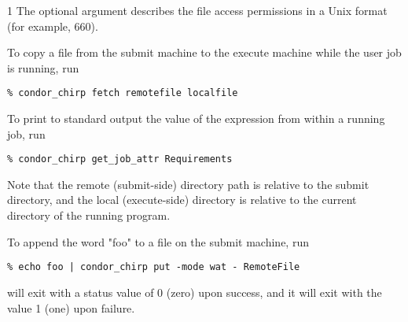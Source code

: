 \begin{ManPage}{\label{man-condor-chirp}}{1}
The optional  argument
describes the file access permissions in a Unix format
(for example, 660).

\begin{Options}
\end{Options}

\Examples

To copy a file from the submit machine to the execute machine while the 
user job is running, run

\footnotesize
\begin{verbatim}
% condor_chirp fetch remotefile localfile
\end{verbatim}
\normalsize

To print to standard output the value of the 
expression from within a running job, run

\footnotesize
\begin{verbatim}
% condor_chirp get_job_attr Requirements
\end{verbatim}
\normalsize

Note that the remote (submit-side) directory path is relative to the
submit directory, and the local (execute-side) directory is relative to the
current directory of the running program.

To append the word "foo" to a file on the submit machine, run

\footnotesize
\begin{verbatim}
% echo foo | condor_chirp put -mode wat - RemoteFile
\end{verbatim}
\normalsize


\ExitStatus

 will exit with a status value of 0 (zero) upon success,
and it will exit with the value 1 (one) upon failure.

\end{ManPage}
